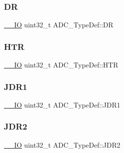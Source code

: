 \mbox{\label{struct_a_d_c___type_def_a84114accead82bd11a0e12a429cdfed9}} 
\subsubsection{\texorpdfstring{DR}{DR}}
{\footnotesize\ttfamily \mbox{\hyperlink{group___c_m_s_i_s___c_m3__core__definitions_gaec43007d9998a0a0e01faede4133d6be}{\+\_\+\+\_\+\+IO}} uint32\+\_\+t A\+D\+C\+\_\+\+Type\+Def\+::\+DR}

\mbox{\label{struct_a_d_c___type_def_a297ac2d83a1837bfdc0333474b977de0}} 
\subsubsection{\texorpdfstring{HTR}{HTR}}
{\footnotesize\ttfamily \mbox{\hyperlink{group___c_m_s_i_s___c_m3__core__definitions_gaec43007d9998a0a0e01faede4133d6be}{\+\_\+\+\_\+\+IO}} uint32\+\_\+t A\+D\+C\+\_\+\+Type\+Def\+::\+H\+TR}

\mbox{\label{struct_a_d_c___type_def_ab4b0a79a9e4a9d5b0a24d7285cf55bdc}} 
\subsubsection{\texorpdfstring{JDR1}{JDR1}}
{\footnotesize\ttfamily \mbox{\hyperlink{group___c_m_s_i_s___c_m3__core__definitions_gaec43007d9998a0a0e01faede4133d6be}{\+\_\+\+\_\+\+IO}} uint32\+\_\+t A\+D\+C\+\_\+\+Type\+Def\+::\+J\+D\+R1}

\mbox{\label{struct_a_d_c___type_def_a898b87cab4f099bcca981cc4c9318b51}} 
\subsubsection{\texorpdfstring{JDR2}{JDR2}}
{\footnotesize\ttfamily \mbox{\hyperlink{group___c_m_s_i_s___c_m3__core__definitions_gaec43007d9998a0a0e01faede4133d6be}{\+\_\+\+\_\+\+IO}} uint32\+\_\+t A\+D\+C\+\_\+\+Type\+Def\+::\+J\+D\+R2}

